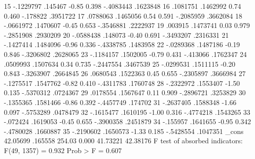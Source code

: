          15  {\VBAR}  -.1229797    .145467    -0.85   0.398    -.4083443    .1623848
         16  {\VBAR}   .1081751   .1462992     0.74   0.460     -.178822    .3951722
         17  {\VBAR}   .0788063   .1465056     0.54   0.591    -.2085959    .3662084
         18  {\VBAR}  -.0661972   .1470607    -0.45   0.653    -.3546881    .2222937
         19  {\VBAR}    .003915   .1473741     0.03   0.979    -.2851908    .2930209
         20  {\VBAR}  -.0588438    .148073    -0.40   0.691    -.3493207    .2316331
         21  {\VBAR}  -.1427414   .1484096    -0.96   0.336    -.4338785    .1483958
         22  {\VBAR}  -.0289368   .1487186    -0.19   0.846    -.3206802    .2628065
         23  {\VBAR}  -.1184157   .1502005    -0.79   0.431     -.413066    .1762347
         24  {\VBAR}   .0509993   .1507634     0.34   0.735    -.2447554    .3467539
         25  {\VBAR}  -.0299531   .1511115    -0.20   0.843    -.3263907    .2664845
         26  {\VBAR}   .0680543   .1522363     0.45   0.655    -.2305897    .3666984
         27  {\VBAR}  -.1275517   .1547762    -0.82   0.410    -.4311783    .1760748
         28  {\VBAR}  -.2322972   .1553407    -1.50   0.135    -.5370312    .0724367
         29  {\VBAR}   .0178554   .1567647     0.11   0.909    -.2896721    .3253829
         30  {\VBAR}  -.1355365   .1581466    -0.86   0.392    -.4457749     .174702
         31  {\VBAR}  -.2637405   .1588348    -1.66   0.097    -.5753289    .0478479
         32  {\VBAR}  -.1615477   .1610195    -1.00   0.316    -.4774218    .1543265
         33  {\VBAR}   -.072424   .1619053    -0.45   0.655    -.3900358    .2451879
         34  {\VBAR}   -.155957   .1641655    -0.95   0.342    -.4780028    .1660887
         35  {\VBAR}  -.2190602   .1650573    -1.33   0.185    -.5428554    .1047351
             {\VBAR}
       _cons {\VBAR}   42.05699    .165558   254.03   0.000     41.73221    42.38176
F test of absorbed indicators: F(49, 1357) = 0.932            Prob > F = 0.607
{\smallskip}
